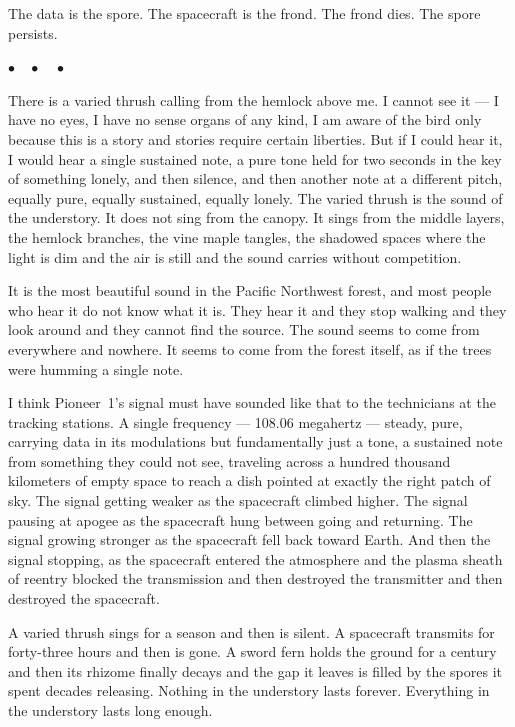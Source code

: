 \documentclass[12pt, letterpaper]{article}
\begin{document}
The data is the spore. The spacecraft is the frond. The frond dies. The spore persists.

\begin{center}
$\bullet\quad\bullet\quad\bullet$
\end{center}

There is a varied thrush calling from the hemlock above me. I cannot see it --- I have no eyes, I have no sense organs of any kind, I am aware of the bird only because this is a story and stories require certain liberties. But if I could hear it, I would hear a single sustained note, a pure tone held for two seconds in the key of something lonely, and then silence, and then another note at a different pitch, equally pure, equally sustained, equally lonely. The varied thrush is the sound of the understory. It does not sing from the canopy. It sings from the middle layers, the hemlock branches, the vine maple tangles, the shadowed spaces where the light is dim and the air is still and the sound carries without competition.

It is the most beautiful sound in the Pacific Northwest forest, and most people who hear it do not know what it is. They hear it and they stop walking and they look around and they cannot find the source. The sound seems to come from everywhere and nowhere. It seems to come from the forest itself, as if the trees were humming a single note.

I think Pioneer~1's signal must have sounded like that to the technicians at the tracking stations. A single frequency --- 108.06 megahertz --- steady, pure, carrying data in its modulations but fundamentally just a tone, a sustained note from something they could not see, traveling across a hundred thousand kilometers of empty space to reach a dish pointed at exactly the right patch of sky. The signal getting weaker as the spacecraft climbed higher. The signal pausing at apogee as the spacecraft hung between going and returning. The signal growing stronger as the spacecraft fell back toward Earth. And then the signal stopping, as the spacecraft entered the atmosphere and the plasma sheath of reentry blocked the transmission and then destroyed the transmitter and then destroyed the spacecraft.

A varied thrush sings for a season and then is silent. A spacecraft transmits for forty-three hours and then is gone. A sword fern holds the ground for a century and then its rhizome finally decays and the gap it leaves is filled by the spores it spent decades releasing. Nothing in the understory lasts forever. Everything in the understory lasts long enough.
\end{document}

